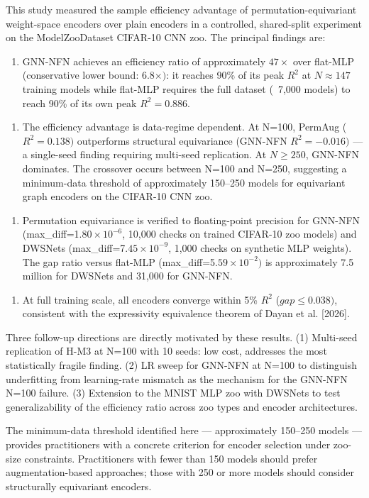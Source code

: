 
This study measured the sample efficiency advantage of permutation-equivariant weight-space encoders over plain encoders in a controlled, shared-split experiment on the ModelZooDataset CIFAR-10 CNN zoo. The principal findings are:

\begin{enumerate}
\item GNN-NFN achieves an efficiency ratio of approximately $47\times$ over flat-MLP (conservative lower bound: 6.$8\times )$: it reaches 90\% of its peak $R^2$ at $N\approx 147$ training models while flat-MLP requires the full dataset (~7,000 models) to reach 90\% of its own peak $R^{2}=0.886$.
\end{enumerate}

\begin{enumerate}
\item The efficiency advantage is data-regime dependent. At N=100, PermAug ($R^{2}=0.138)$ outperforms structural equivariance (GNN-NFN $R^{2}=-0.016)$ --- a single-seed finding requiring multi-seed replication. At $N\geq 250$, GNN-NFN dominates. The crossover occurs between N=100 and N=250, suggesting a minimum-data threshold of approximately 150--250 models for equivariant graph encoders on the CIFAR-10 CNN zoo.
\end{enumerate}

\begin{enumerate}
\item Permutation equivariance is verified to floating-point precision for GNN-NFN (max\_diff=1.$80\times 10^{-6}$, 10,000 checks on trained CIFAR-10 zoo models) and DWSNets (max\_diff=7.$45\times 10^{-9}$, 1,000 checks on synthetic MLP weights). The gap ratio versus flat-MLP (max\_diff=5.$59\times 10^{-2})$ is approximately 7.5 million for DWSNets and 31,000 for GNN-NFN.
\end{enumerate}

\begin{enumerate}
\item At full training scale, all encoders converge within 5\% $R^2$ ($gap\leq 0.038)$, consistent with the expressivity equivalence theorem of Dayan et al. [2026].
\end{enumerate}

Three follow-up directions are directly motivated by these results. (1) Multi-seed replication of H-M3 at N=100 with 10 seeds: low cost, addresses the most statistically fragile finding. (2) LR sweep for GNN-NFN at N=100 to distinguish underfitting from learning-rate mismatch as the mechanism for the GNN-NFN N=100 failure. (3) Extension to the MNIST MLP zoo with DWSNets to test generalizability of the efficiency ratio across zoo types and encoder architectures.

The minimum-data threshold identified here --- approximately 150--250 models --- provides practitioners with a concrete criterion for encoder selection under zoo-size constraints. Practitioners with fewer than 150 models should prefer augmentation-based approaches; those with 250 or more models should consider structurally equivariant encoders.

